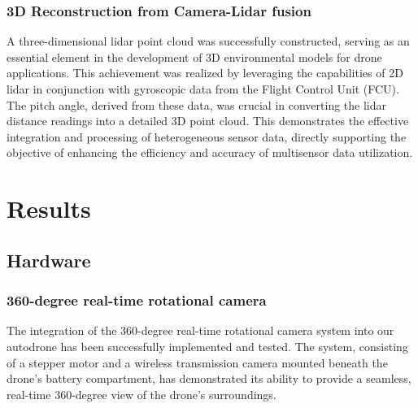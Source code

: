 \documentclass[conference]{IEEEtran}
\begin{document}
\subsubsection{3D Reconstruction from Camera-Lidar fusion}
A three-dimensional lidar point cloud was successfully constructed, serving as an essential element in the development of 3D environmental models for drone applications. This achievement was realized by leveraging the capabilities of 2D lidar in conjunction with gyroscopic data from the Flight Control Unit (FCU). The pitch angle, derived from these data, was crucial in converting the lidar distance readings into a detailed 3D point cloud. This demonstrates the effective integration and processing of heterogeneous sensor data, directly supporting the objective of enhancing the efficiency and accuracy of multisensor data utilization.

\section{Results}

\subsection{Hardware}
\subsubsection{360-degree real-time rotational camera
} 
The integration of the 360-degree real-time rotational camera system into our autodrone has been successfully implemented and tested. The system, consisting of a stepper motor and a wireless transmission camera mounted beneath the drone's battery compartment, has demonstrated its ability to provide a seamless, real-time 360-degree view of the drone's surroundings.
\end{document}
